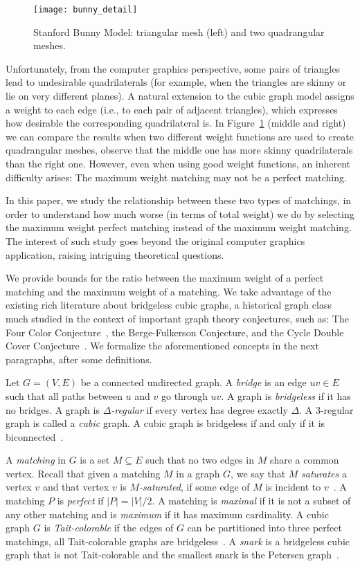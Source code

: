 \documentclass{article}
\begin{document}
\begin{figure}[t]
\centering
\texttt{[image: bunny\_detail]}
\caption{Stanford Bunny Model: triangular mesh (left) and two quadrangular meshes.}
\label{fig:bunny}
\end{figure}

Unfortunately, from the computer graphics perspective, some pairs of triangles lead to undesirable quadrilaterals (for example, when the triangles are skinny or lie on very different planes). 
A natural extension to the cubic graph model assigns a weight to each edge (i.e., to each pair of adjacent triangles), which expresses how desirable the corresponding quadrilateral is. 
In Figure~\ref{fig:bunny} (middle and right) we can compare the results when two different weight functions are used to create  quadrangular meshes, observe that the middle one has more skinny quadrilaterals than the right one.
However, even when using good weight functions, an inherent difficulty arises: The maximum weight matching may not be a perfect matching.

In this paper, we study the relationship between these two types of matchings, in order to understand how much worse (in terms of total weight) we do by selecting the maximum weight perfect matching instead of the maximum weight matching. The interest of such study goes beyond the original computer graphics application, raising intriguing theoretical questions.

We provide bounds for the ratio between the maximum weight of a perfect matching and the maximum weight of a matching. We take advantage of the existing rich literature about bridgeless cubic graphs, a historical graph class much studied in the context of important graph theory conjectures, such as: The Four Color Conjecture~\cite{Appel}, the Berge-Fulkerson Conjecture, and the Cycle Double Cover Conjecture~\cite{Celmins}. We formalize the aforementioned concepts in the next paragraphs, after some definitions.

Let $G=(V,E)$ be a connected undirected graph. A \emph{bridge} is an edge $uv \in E$ such that all paths between $u$ and $v$ go through $uv$. A graph is \emph{bridgeless} if it has no bridges. A graph is \emph{$\Delta$-regular} if every vertex has degree exactly $\Delta$. A $3$-regular graph is called a \emph{cubic} graph. A cubic graph is bridgeless if and only if it is biconnected~\cite{bm}.

A \emph{matching} in $G$ is a set $M \subseteq E$ such that no two edges in $M$ share a common vertex. Recall that given a matching $M$ in a graph $G$, we say that $M$ \emph{saturates} a vertex $v$ and that vertex $v$ is \emph{$M$-saturated}, if some edge of $M$ is incident to $v$~\cite{bm}.
A matching $P$ is \emph{perfect} if $|P| = |V|/2$. 
A matching is \emph{maximal} if it is not a subset of any other matching and is \emph{maximum} if it has maximum cardinality. 
 A cubic graph $G$ is \emph{Tait-colorable} if the edges of $G$ can be
partitioned into three perfect matchings, all Tait-colorable graphs
are bridgeless~\cite{bm}. A \emph{snark} is a bridgeless cubic graph
that is not Tait-colorable and the smallest snark is the Petersen graph~\cite{isaacs75}.
\end{document}
